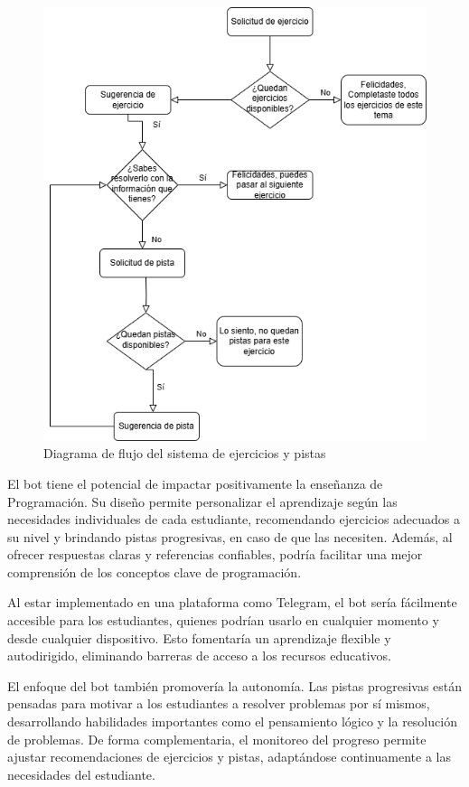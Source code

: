 \documentclass{article}
\begin{document}
\begin{figure}
    \centering
    \includegraphics[width=0.7\linewidth]{flow.png}
    \caption{Diagrama de flujo del sistema de ejercicios y pistas}
    \label{fig:e-h-diagram}
\end{figure}

El bot tiene el potencial de impactar positivamente la enseñanza de Programación. Su diseño permite personalizar el aprendizaje según las necesidades individuales de cada estudiante, recomendando ejercicios adecuados a su nivel y brindando pistas progresivas, en caso de que las necesiten. Además, al ofrecer respuestas claras y referencias confiables, podría facilitar una mejor comprensión de los conceptos clave de programación.

Al estar implementado en una plataforma como Telegram, el bot sería fácilmente accesible para los estudiantes, quienes podrían usarlo en cualquier momento y desde cualquier dispositivo. Esto fomentaría un aprendizaje flexible y autodirigido, eliminando barreras de acceso a los recursos educativos.

El enfoque del bot también promovería la autonomía. Las pistas progresivas están pensadas para motivar a los estudiantes a resolver problemas por sí mismos, desarrollando habilidades importantes como el pensamiento lógico y la resolución de problemas. De forma complementaria, el monitoreo del progreso permite ajustar recomendaciones de ejercicios y pistas, adaptándose continuamente a las necesidades del estudiante.

\end{document}
